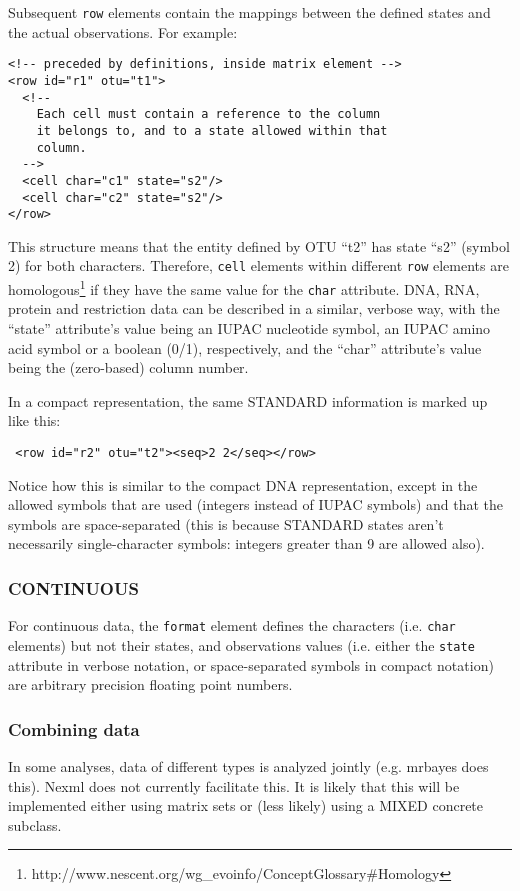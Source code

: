 \documentclass{article}
\newcommand{\code}{\texttt}
\begin{document}
Subsequent \code{row} elements contain the mappings between the defined states and the actual observations. For example:
\begin{verbatim}
<!-- preceded by definitions, inside matrix element -->
<row id="r1" otu="t1">
  <!--
    Each cell must contain a reference to the column 
    it belongs to, and to a state allowed within that
    column. 
  -->
  <cell char="c1" state="s2"/>
  <cell char="c2" state="s2"/>
</row>
\end{verbatim}

This structure means that the entity defined by OTU ``t2'' has state ``s2'' (symbol 2) for both characters. Therefore, \code{cell} 
elements within different \code{row} elements are homologous\footnote{http://www.nescent.org/wg\_evoinfo/ConceptGlossary\#Homology} 
if they have the same value for the \code{char} attribute.
DNA, RNA, protein and restriction data can be described in a similar, verbose way, with the ``state'' attribute's value being an IUPAC 
nucleotide symbol, an IUPAC amino acid symbol or a boolean (0/1), respectively, and the ``char'' attribute's value being the (zero-based) 
column number.

In a compact representation, the same STANDARD information is marked up like this:
\begin{verbatim}
 <row id="r2" otu="t2"><seq>2 2</seq></row>
\end{verbatim}

Notice how this is similar to the compact DNA representation, except in the allowed symbols that are used (integers instead of IUPAC 
symbols) and that the symbols are space-separated (this is because STANDARD states aren't necessarily single-character symbols: 
integers greater than 9 are allowed also).

\subsubsection{CONTINUOUS}
For continuous data, the \code{format} element defines the characters (i.e. \code{char} elements) but not their states, 
and observations values (i.e. either the \code{state} attribute in verbose notation, or space-separated symbols in compact 
notation) are arbitrary precision floating point numbers.

\subsubsection{Combining data}
In some analyses, data of different types is analyzed jointly (e.g. mrbayes does this). Nexml does not currently facilitate this. It 
is likely that this will be implemented either using matrix sets or (less likely) using a MIXED concrete subclass.
\end{document}

